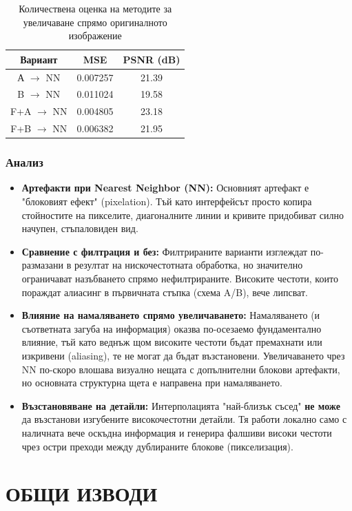 \documentclass[12pt]{article}
\begin{document}
\begin{table}[H]
\centering
\begin{tabular}{|c|c|c|}
\hline
\textbf{Вариант} & \textbf{MSE} & \textbf{PSNR (dB)} \\
\hline
А $\rightarrow$ NN & 0.007257 & 21.39 \\
\hline
B $\rightarrow$ NN & 0.011024 & 19.58 \\
\hline
F+A $\rightarrow$ NN & 0.004805 & 23.18 \\
\hline
F+B $\rightarrow$ NN & 0.006382 & 21.95 \\
\hline
\end{tabular}
\caption{Количествена оценка на методите за увеличаване спрямо оригиналното изображение}
\end{table}

\subsubsection{Анализ}
\begin{itemize}
    \item \textbf{Артефакти при Nearest Neighbor (NN):} Основният артефакт е "блоковият ефект" (pixelation). Тъй като интерфейсът просто копира стойностите на пикселите, диагоналните линии и кривите придобиват силно начупен, стъпаловиден вид.
    \item \textbf{Сравнение с филтрация и без:} Филтрираните варианти изглеждат по-размазани в резултат на нискочестотната обработка, но значително ограничават назъбването спрямо нефилтрираните. Високите честоти, които пораждат алиасинг в първичната стъпка (схема A/B), вече липсват.
    \item \textbf{Влияние на намаляването спрямо увеличаването:} Намаляването (и съответната загуба на информация) оказва по-осезаемо фундаментално влияние, тъй като веднъж щом високите честоти бъдат премахнати или изкривени (aliasing), те не могат да бъдат възстановени. Увеличаването чрез NN по-скоро влошава визуално нещата с допълнителни блокови артефакти, но основната структурна щета е направена при намаляването.
    \item \textbf{Възстановяване на детайли:} Интерполацията "най-близък съсед" \textbf{не може} да възстанови изгубените високочестотни детайли. Тя работи локално само с наличната вече оскъдна информация и генерира фалшиви високи честоти чрез остри преходи между дублираните блокове (пикселизация).
\end{itemize}

\section{ОБЩИ ИЗВОДИ}
\end{document}
